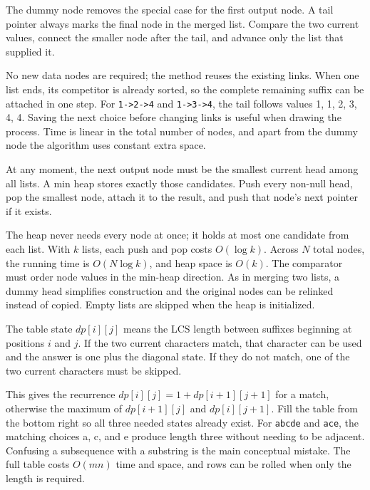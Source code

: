 \expandafter\def\csname sourcewalkthrough@44\endcsname{%
The dummy node removes the special case for the first output node. A tail
pointer always marks the final node in the merged list. Compare the two current
values, connect the smaller node after the tail, and advance only the list
that supplied it.

No new data nodes are required; the method reuses the existing links. When one
list ends, its competitor is already sorted, so the complete remaining suffix
can be attached in one step. For \texttt{1->2->4} and \texttt{1->3->4}, the
tail follows values 1, 1, 2, 3, 4, 4. Saving the next choice before changing
links is useful when drawing the process. Time is linear in the total number
of nodes, and apart from the dummy node the algorithm uses constant extra
space.}

\expandafter\def\csname sourcewalkthrough@45\endcsname{%
At any moment, the next output node must be the smallest current head among
all lists. A min heap stores exactly those candidates. Push every non-null
head, pop the smallest node, attach it to the result, and push that node's next
pointer if it exists.

The heap never needs every node at once; it holds at most one candidate from
each list. With \(k\) lists, each push and pop costs \(O(\log k)\). Across
\(N\) total nodes, the running time is \(O(N\log k)\), and heap space is
\(O(k)\). The comparator must order node values in the min-heap direction.
As in merging two lists, a dummy head simplifies construction and the
original nodes can be relinked instead of copied. Empty lists are skipped when
the heap is initialized.}

\expandafter\def\csname sourcewalkthrough@46\endcsname{%
The table state \(dp[i][j]\) means the LCS length between suffixes beginning at
positions \(i\) and \(j\). If the two current characters match, that character
can be used and the answer is one plus the diagonal state. If they do not
match, one of the two current characters must be skipped.

This gives the recurrence
\(dp[i][j]=1+dp[i+1][j+1]\) for a match, otherwise the maximum of
\(dp[i+1][j]\) and \(dp[i][j+1]\). Fill the table from the bottom right so
all three needed states already exist. For \texttt{abcde} and \texttt{ace},
the matching choices a, c, and e produce length three without needing to be
adjacent. Confusing a subsequence with a substring is the main conceptual
mistake. The full table costs \(O(mn)\) time and space, and rows can be rolled
when only the length is required.}


